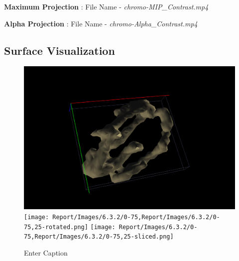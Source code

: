 \documentclass{article}
\begin{document}
\medskip

\textbf{Maximum Projection} : File Name - \textit{chromo-MIP\_Contrast.mp4}

\textbf{Alpha Projection} : File Name - \textit{chromo-Alpha\_Contrast.mp4}
\subsection*{Surface Visualization}

\begin{figure}
    \centering
    \includegraphics[width=0.5\linewidth]{Report/Images/6.3.2/0-75,25.png}
    \texttt{[image: Report/Images/6.3.2/0-75,Report/Images/6.3.2/0-75,25-rotated.png]}
    \texttt{[image: Report/Images/6.3.2/0-75,Report/Images/6.3.2/0-75,25-sliced.png]}
    \caption{Enter Caption}
    \label{fig:enter-label}
\end{figure}
\end{document}
